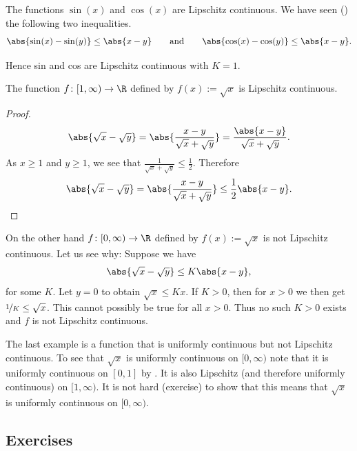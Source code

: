 \documentclass[12pt]{book}
\begin{document}
\begin{example}
The functions $\sin(x)$ and $\cos(x)$ are Lipschitz continuous.
We have seen () the following two inequalities.
\begin{equation*}
\abs{\sin(x)-\sin(y)} 
\leq \abs{x-y}
\qquad \text{and} \qquad
\abs{\cos(x)-\cos(y)}
\leq \abs{x-y} .
\end{equation*}

Hence sin and cos are Lipschitz continuous with $K=1$.
\end{example}

\begin{example}
The function $f \colon [1,\infty) \to \R$ defined by $f(x) := \sqrt{x}$
is Lipschitz continuous. 

\begin{proof}
\begin{equation*}
\abs{\sqrt{x}-\sqrt{y}} = 
\abs{\frac{x-y}{\sqrt{x}+\sqrt{y}}}
=
\frac{\abs{x-y}}{\sqrt{x}+\sqrt{y}} .
\end{equation*}
As $x \geq 1$ and $y \geq 1$, we see that $\frac{1}{\sqrt{x}+\sqrt{y}}
\leq \frac{1}{2}$.
Therefore
\begin{equation*}
\abs{\sqrt{x}-\sqrt{y}} = 
\abs{\frac{x-y}{\sqrt{x}+\sqrt{y}}}
\leq
\frac{1}{2}
\abs{x-y}.
\end{equation*}
\end{proof}

On the other hand $f \colon [0,\infty) \to \R$ defined by
$f(x) := \sqrt{x}$ is not Lipschitz continuous.
Let us see why:
Suppose we have
\begin{equation*}
\abs{\sqrt{x}-\sqrt{y}} 
\leq
K \abs{x-y} ,
\end{equation*}
for some $K$.
Let $y=0$ to obtain
$\sqrt{x} \leq K x$.
 If $K > 0$, then for $x > 0$ we then get
$\nicefrac{1}{K} \leq \sqrt{x}$.
This cannot possibly be true for all
$x > 0$.
Thus no such $K > 0$ exists and $f$ is not
Lipschitz continuous.

The last example is a function that is uniformly
continuous but not Lipschitz continuous.
To see that $\sqrt{x}$
is
uniformly continuous on $[0,\infty)$ note that it is uniformly continuous on
$[0,1]$ by .
It is also Lipschitz (and
therefore uniformly continuous) on $[1,\infty)$.
It is not hard (exercise)
to show that this means that $\sqrt{x}$ is uniformly continuous on
$[0,\infty)$.
\end{example}

\subsection*{Exercises}
\end{document}

